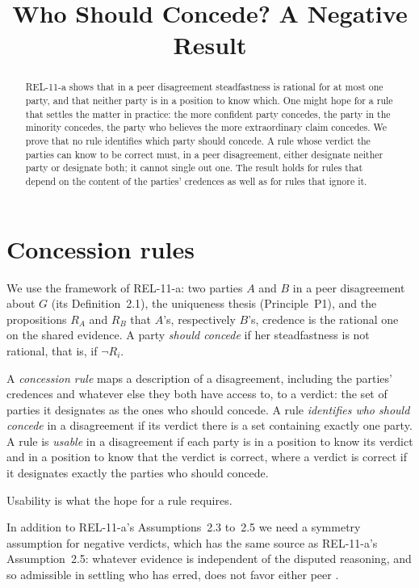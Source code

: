 \documentclass{situationist-preprint}
\title{Who Should Concede? A Negative Result}
\begin{document}
\maketitle

\begin{abstract}
REL-11-a shows that in a peer disagreement steadfastness is rational for at most one party, and that neither party is in a position to know which. One might hope for a rule that settles the matter in practice: the more confident party concedes, the party in the minority concedes, the party who believes the more extraordinary claim concedes. We prove that no rule identifies which party should concede. A rule whose verdict the parties can know to be correct must, in a peer disagreement, either designate neither party or designate both; it cannot single out one. The result holds for rules that depend on the content of the parties' credences as well as for rules that ignore it.
\end{abstract}

\section{Concession rules}

We use the framework of REL-11-a: two parties $A$ and $B$ in a peer disagreement about $G$ (its Definition~2.1), the uniqueness thesis (Principle~P1), and the propositions $R_A$ and $R_B$ that $A$'s, respectively $B$'s, credence is the rational one on the shared evidence. A party \emph{should concede} if her steadfastness is not rational, that is, if $\neg R_i$.

\begin{definition}\label{d:rule}
A \emph{concession rule} maps a description of a disagreement, including the parties' credences and whatever else they both have access to, to a verdict: the set of parties it designates as the ones who should concede. A rule \emph{identifies who should concede} in a disagreement if its verdict there is a set containing exactly one party. A rule is \emph{usable} in a disagreement if each party is in a position to know its verdict and in a position to know that the verdict is correct, where a verdict is correct if it designates exactly the parties who should concede.
\end{definition}

Usability is what the hope for a rule requires.

In addition to REL-11-a's Assumptions~2.3 to~2.5 we need a symmetry assumption for negative verdicts, which has the same source as REL-11-a's Assumption~2.5: whatever evidence is independent of the disputed reasoning, and so admissible in settling who has erred, does not favor either peer \citep{Elga2007,Christensen2007}.
\end{document}
